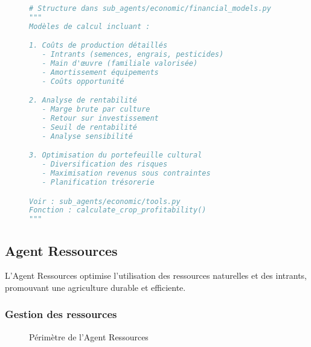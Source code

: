 \begin{figure}[H]
\centering
\begin{lstlisting}[language=Python, caption=Modèle de calcul économique (aperçu)]
# Structure dans sub_agents/economic/financial_models.py
"""
Modèles de calcul incluant :

1. Coûts de production détaillés
   - Intrants (semences, engrais, pesticides)
   - Main d'œuvre (familiale valorisée)
   - Amortissement équipements
   - Coûts opportunité

2. Analyse de rentabilité
   - Marge brute par culture
   - Retour sur investissement
   - Seuil de rentabilité
   - Analyse sensibilité

3. Optimisation du portefeuille cultural
   - Diversification des risques
   - Maximisation revenus sous contraintes
   - Planification trésorerie

Voir : sub_agents/economic/tools.py
Fonction : calculate_crop_profitability()
"""
\end{lstlisting}
\end{figure}

\subsection{Agent Ressources}

L'Agent Ressources optimise l'utilisation des ressources naturelles et des intrants, promouvant une agriculture durable et efficiente.

\subsubsection{Gestion des ressources}

\begin{figure}[H]
\centering
{}
\caption{Périmètre de l'Agent Ressources}
\end{figure}

